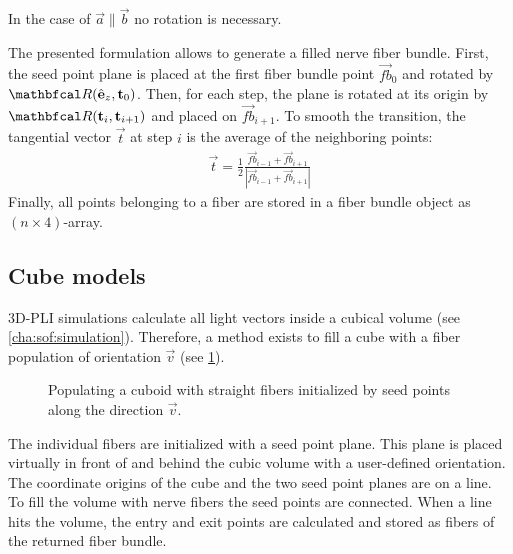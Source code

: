 % 
In the case of $\vec{a} \parallel \vec{b}$ no rotation is necessary.
\par
% 
The presented formulation allows to generate a filled nerve fiber bundle.
First, the seed point plane is placed at the first fiber bundle point $\vec{fb}_0$ and rotated by $\mat{R}(\hat{\vec{e}}_z, \vec{t}_0)$.
Then, for each step, the plane is rotated at its origin by $\mat{R}(\vec{t}_i, \vec{t}_{i+1})$ and placed on $\vec{fb}_{i+1}$.
To smooth the transition, the tangential vector $\vec{t}$ at step $i$ is the average of the neighboring points:
\begin{align}
    \vec{t} = \frac{1}{2} \frac{\vec{fb}_{i-1} + \vec{fb}_{i+1}}{|\vec{fb}_{i-1} + \vec{fb}_{i+1}|}
\end{align}
%
Finally, all points belonging to a fiber are stored in a fiber bundle object as $(n \times 4)$-array.
%
%
%
\subsection{Cube models} \label{sec:cubeModelBuilding}
%
\tikzset{external/export next=false}
\unskip
%
\ac{3D-PLI} simulations calculate all light vectors inside a cubical volume (see \cref{cha:sof:simulation}).
Therefore, a method exists to fill a cube with a fiber population of orientation $\vec{v}$ (see \cref{fig:cubeBuild}).
%
\begin{figure}[!t]
    \centering
    \setlength{\tikzwidth}{0.5\textwidth}
	\caption[]{Populating a cuboid with straight fibers initialized by seed points along the direction $\vec{v}$.}
    \label{fig:cubeBuild}%
\end{figure}
% 
The individual fibers are initialized with a seed point plane.
This plane is placed virtually in front of and behind the cubic volume with a user-defined orientation.
The coordinate origins of the cube and the two seed point planes are on a line.
To fill the volume with nerve fibers the seed points are connected.
When a line hits the volume, the entry and exit points are calculated and stored as fibers of the returned fiber bundle.
%
%
%
